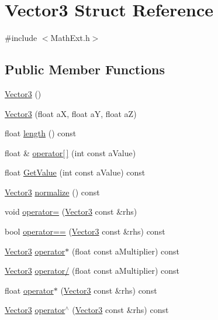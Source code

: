 \hypertarget{structVector3}{}\section{Vector3 Struct Reference}
\label{structVector3}


{\ttfamily \#include $<$Math\+Ext.\+h$>$}

\subsection*{Public Member Functions}
\begin{DoxyCompactItemize}
\item 
\hyperlink{structVector3_a0f49191f7e001e7f7ae1cb49522118b4}{Vector3} ()
\item 
\hyperlink{structVector3_adaa692d3f0a80a8ce93ba86a40eec477}{Vector3} (float aX, float aY, float aZ)
\item 
float \hyperlink{structVector3_a30db3d517cb422cb78a4be0cf52bc89e}{length} () const 
\item 
float \& \hyperlink{structVector3_a39053b74f23768186d25f9e1075e83e4}{operator\mbox{[}$\,$\mbox{]}} (int const a\+Value)
\item 
float \hyperlink{structVector3_a40116dbcee385d3da07b58890114d8bb}{Get\+Value} (int const a\+Value) const 
\item 
\hyperlink{structVector3}{Vector3} \hyperlink{structVector3_aa9a41fdd0584091e48784c96999972f1}{normalize} () const 
\item 
void \hyperlink{structVector3_acbf25a03f8ac6d0533592d7197d1f468}{operator=} (\hyperlink{structVector3}{Vector3} const \&rhs)
\item 
bool \hyperlink{structVector3_a3d69d69e5df0bd2def1a4702dc1c3543}{operator==} (\hyperlink{structVector3}{Vector3} const \&rhs) const 
\item 
\hyperlink{structVector3}{Vector3} \hyperlink{structVector3_a6e7a40ff30de03705015e024463e84c0}{operator$\ast$} (float const a\+Multiplier) const 
\item 
\hyperlink{structVector3}{Vector3} \hyperlink{structVector3_a4d116db172e9ae47189b9f9d4d6425cd}{operator/} (float const a\+Multiplier) const 
\item 
float \hyperlink{structVector3_a5468b6e3d4b013cf853af573d4a69ed8}{operator$\ast$} (\hyperlink{structVector3}{Vector3} const \&rhs) const 
\item 
\hyperlink{structVector3}{Vector3} \hyperlink{structVector3_a64cd62b5d6ce9a5bb4e26fff47b67d68}{operator$^\wedge$} (\hyperlink{structVector3}{Vector3} const \&rhs) const 

\end{DoxyCompactItemize}
